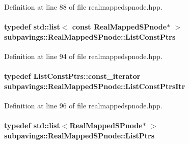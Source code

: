 \-Definition at line 88 of file realmappedspnode.\-hpp.

\hypertarget{classsubpavings_1_1RealMappedSPnode_aba04df267c93463fbb6a90d85e11b627}{
\paragraph[{\-List\-Const\-Ptrs}]{\setlength{\rightskip}{0pt plus 5cm}typedef std\-::list$<$ const {\bf \-Real\-Mapped\-S\-Pnode}$\ast$ $>$ {\bf subpavings\-::\-Real\-Mapped\-S\-Pnode\-::\-List\-Const\-Ptrs}}}\label{classsubpavings_1_1RealMappedSPnode_aba04df267c93463fbb6a90d85e11b627}


\-Definition at line 94 of file realmappedspnode.\-hpp.

\hypertarget{classsubpavings_1_1RealMappedSPnode_ac4e7b7e57068590fc47a5951453754b2}{
\paragraph[{\-List\-Const\-Ptrs\-Itr}]{\setlength{\rightskip}{0pt plus 5cm}typedef \-List\-Const\-Ptrs\-::const\-\_\-iterator {\bf subpavings\-::\-Real\-Mapped\-S\-Pnode\-::\-List\-Const\-Ptrs\-Itr}}}\label{classsubpavings_1_1RealMappedSPnode_ac4e7b7e57068590fc47a5951453754b2}


\-Definition at line 96 of file realmappedspnode.\-hpp.

\hypertarget{classsubpavings_1_1RealMappedSPnode_a13d2adc6fa08d7b1e70a7956eac1affe}{
\paragraph[{\-List\-Ptrs}]{\setlength{\rightskip}{0pt plus 5cm}typedef std\-::list$<${\bf \-Real\-Mapped\-S\-Pnode}$\ast$ $>$ {\bf subpavings\-::\-Real\-Mapped\-S\-Pnode\-::\-List\-Ptrs}}}\label{classsubpavings_1_1RealMappedSPnode_a13d2adc6fa08d7b1e70a7956eac1affe}


